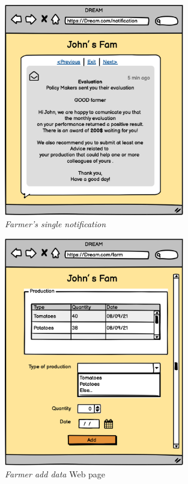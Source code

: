 \begin{figure}[H]
    \begin{center}
    \includegraphics[width=0.7\textwidth]{mocups/Notification.png}
    \caption{\emph{Farmer's single notification}}
    \label{fig:sequence1}
    \end{center}
\end{figure}

\begin{figure}[H]
    \begin{center}
    \includegraphics[width=0.7\textwidth]{mocups/AddData.png}
    \caption{\emph{Farmer add data} Web page}
    \label{fig:sequence1}
    \end{center}
\end{figure}

